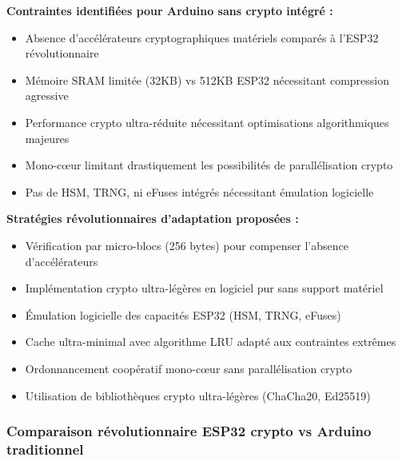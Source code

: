 \textbf{Contraintes identifiées pour Arduino sans crypto intégré :}
\begin{itemize}
    \item Absence d'accélérateurs cryptographiques matériels comparés à l'ESP32 révolutionnaire
    \item Mémoire SRAM limitée (32KB) vs 512KB ESP32 nécessitant compression agressive
    \item Performance crypto ultra-réduite nécessitant optimisations algorithmiques majeures
    \item Mono-cœur limitant drastiquement les possibilités de parallélisation crypto
    \item Pas de HSM, TRNG, ni eFuses intégrés nécessitant émulation logicielle
\end{itemize}

\textbf{Stratégies révolutionnaires d'adaptation proposées :}
\begin{itemize}
    \item Vérification par micro-blocs (256 bytes) pour compenser l'absence d'accélérateurs
    \item Implémentation crypto ultra-légères en logiciel pur sans support matériel
    \item Émulation logicielle des capacités ESP32 (HSM, TRNG, eFuses)
    \item Cache ultra-minimal avec algorithme LRU adapté aux contraintes extrêmes
    \item Ordonnancement coopératif mono-cœur sans parallélisation crypto
    \item Utilisation de bibliothèques crypto ultra-légères (ChaCha20, Ed25519)
\end{itemize}

\subsubsection{Comparaison révolutionnaire ESP32 crypto vs Arduino traditionnel}

